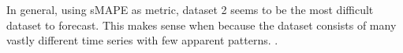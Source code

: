 
In general, using sMAPE as metric, dataset 2 seems to be the most difficult dataset to forecast.
This makes sense when because the dataset consists of many vastly different time series
with few apparent patterns.
.